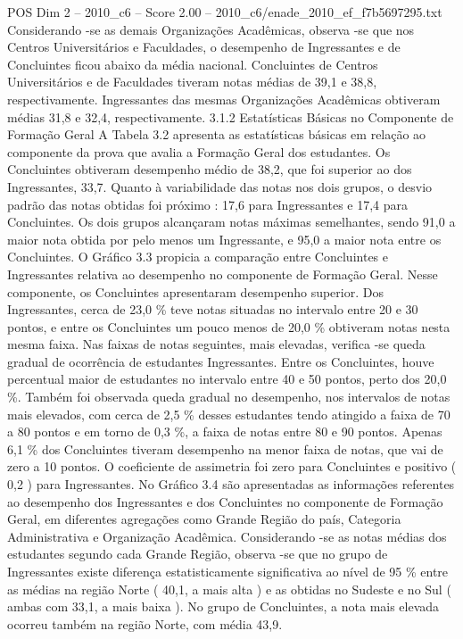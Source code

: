 \begin{textsample}{POS Dim 2 – 2010\_c6 – Score 2.00 – 2010\_c6/enade\_2010\_ef\_f7b5697295.txt}
Considerando -se as demais Organizações Acadêmicas, observa -se que nos Centros Universitários e Faculdades, o desempenho de Ingressantes e de Concluintes ficou abaixo da média nacional.
Concluintes de Centros Universitários e de Faculdades tiveram notas médias de 39,1 e 38,8, respectivamente.
Ingressantes das mesmas Organizações Acadêmicas obtiveram médias 31,8 e 32,4, respectivamente. 3.1.2 Estatísticas Básicas no Componente de Formação Geral A Tabela 3.2 apresenta as estatísticas básicas em relação ao componente da prova que avalia a Formação Geral dos estudantes.
Os Concluintes obtiveram desempenho médio de 38,2, que foi superior ao dos Ingressantes, 33,7.
Quanto à variabilidade das notas nos dois grupos, o desvio padrão das notas obtidas foi próximo : 17,6 para Ingressantes e 17,4 para Concluintes.
Os dois grupos alcançaram notas máximas semelhantes, sendo 91,0 a maior nota obtida por pelo menos um Ingressante, e 95,0 a maior nota entre os Concluintes.
O Gráfico 3.3 propicia a comparação entre Concluintes e Ingressantes relativa ao desempenho no componente de Formação Geral.
Nesse componente, os Concluintes apresentaram desempenho superior.
Dos Ingressantes, cerca de 23,0 \% teve notas situadas no intervalo entre 20 e 30 pontos, e entre os Concluintes um pouco menos de 20,0 \% obtiveram notas nesta mesma faixa.
Nas faixas de notas seguintes, mais elevadas, verifica -se queda gradual de ocorrência de estudantes Ingressantes.
Entre os Concluintes, houve percentual maior de estudantes no intervalo entre 40 e 50 pontos, perto dos 20,0 \%.
Também foi observada queda gradual no desempenho, nos intervalos de notas mais elevados, com cerca de 2,5 \% desses estudantes tendo atingido a faixa de 70 a 80 pontos e em torno de 0,3 \%, a faixa de notas entre 80 e 90 pontos.
Apenas 6,1 \% dos Concluintes tiveram desempenho na menor faixa de notas, que vai de zero a 10 pontos.
O coeficiente de assimetria foi zero para Concluintes e positivo ( 0,2 ) para Ingressantes.
No Gráfico 3.4 são apresentadas as informações referentes ao desempenho dos Ingressantes e dos Concluintes no componente de Formação Geral, em diferentes agregações como Grande Região do país, Categoria Administrativa e Organização Acadêmica.
Considerando -se as notas médias dos estudantes segundo cada Grande Região, observa -se que no grupo de Ingressantes existe diferença estatisticamente significativa ao nível de 95 \% entre as médias na região Norte ( 40,1, a mais alta ) e as obtidas no Sudeste e no Sul ( ambas com 33,1, a mais baixa ).
No grupo de Concluintes, a nota mais elevada ocorreu também na região Norte, com média 43,9.

\end{textsample}
